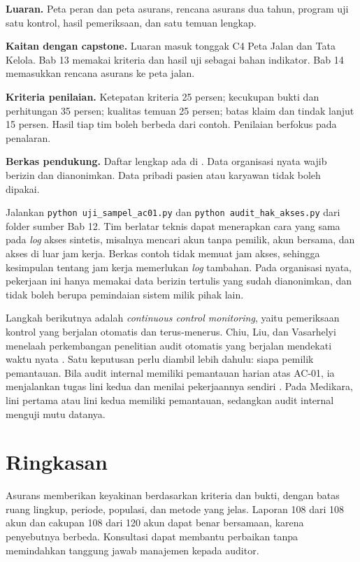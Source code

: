 \textbf{Luaran.} Peta peran dan peta asurans, rencana asurans dua tahun, program uji satu kontrol,
hasil pemeriksaan, dan satu temuan lengkap.

\textbf{Kaitan dengan capstone.} Luaran masuk tonggak C4 Peta Jalan dan Tata Kelola. Bab 13 memakai
kriteria dan hasil uji sebagai bahan indikator. Bab 14 memasukkan rencana asurans ke peta jalan.

\textbf{Kriteria penilaian.} Ketepatan kriteria 25 persen; kecukupan bukti dan perhitungan 35
persen; kualitas temuan 25 persen; batas klaim dan tindak lanjut 15 persen. Hasil tiap tim boleh
berbeda dari contoh. Penilaian berfokus pada penalaran.

\textbf{Berkas pendukung.} Daftar lengkap ada di . Data
organisasi nyata wajib berizin dan dianonimkan. Data pribadi pasien atau karyawan tidak boleh
dipakai.

\begin{pendalaman}[title={Pendalaman Teknis (Opsional): Teknik Audit Berbantuan Komputer}]
Jalankan \texttt{python uji\_sampel\_ac01.py} dan \texttt{python audit\_hak\_akses.py} dari folder
sumber Bab 12. Tim berlatar teknis dapat menerapkan cara yang sama pada \textit{log} akses sintetis,
misalnya mencari akun tanpa pemilik, akun bersama, dan akses di luar jam kerja. Berkas contoh tidak
memuat jam akses, sehingga kesimpulan tentang jam kerja memerlukan \textit{log} tambahan. Pada
organisasi nyata, pekerjaan ini hanya memakai data berizin tertulis yang sudah dianonimkan, dan
tidak boleh berupa pemindaian sistem milik pihak lain.

Langkah berikutnya adalah \textit{continuous control monitoring}, yaitu pemeriksaan kontrol yang
berjalan otomatis dan terus-menerus. Chiu, Liu, dan Vasarhelyi menelaah perkembangan penelitian
audit otomatis yang berjalan mendekati waktu nyata \cite{c12-chiu2014}. Satu keputusan perlu diambil
lebih dahulu: siapa pemilik pemantauan. Bila audit internal memiliki pemantauan harian atas AC-01,
ia menjalankan tugas lini kedua dan menilai pekerjaannya sendiri \cite{iia-tlm2026}. Pada Medikara,
lini pertama atau lini kedua memiliki pemantauan, sedangkan audit internal menguji mutu datanya.
\end{pendalaman}

\section{Ringkasan}

Asurans memberikan keyakinan berdasarkan kriteria dan bukti, dengan batas ruang lingkup, periode,
populasi, dan metode yang jelas. Laporan 108 dari 108 akun dan cakupan 108 dari 120 akun dapat benar
bersamaan, karena penyebutnya berbeda. Konsultasi dapat membantu perbaikan tanpa memindahkan
tanggung jawab manajemen kepada auditor.

